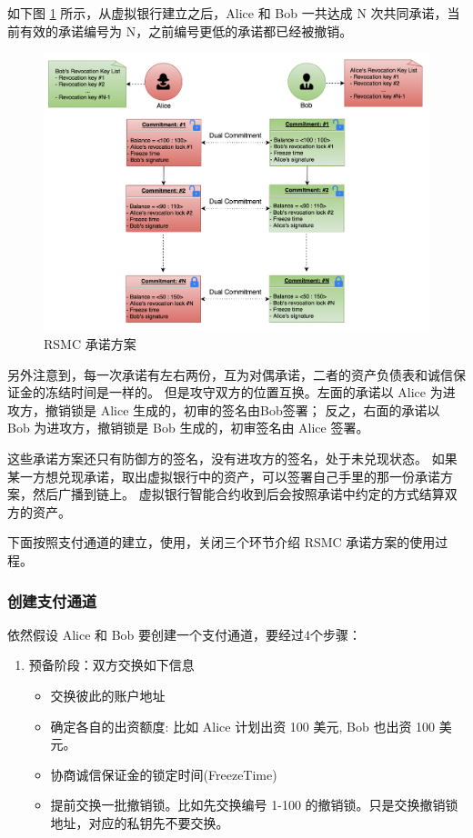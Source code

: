 \begin{appendices}
如下图 \ref{fig:rsmc_3} 所示，从虚拟银行建立之后，Alice 和 Bob 一共达成 N 次共同承诺，当前有效的承诺编号为 N，之前编号更低的承诺都已经被撤销。

\begin{figure}[h!]
    \centering
    \includegraphics[width=12cm, keepaspectratio]{../images/dual_rsmc_3.png}
    \caption{RSMC 承诺方案}
    \label{fig:rsmc_3}
\end{figure}

另外注意到，每一次承诺有左右两份，互为对偶承诺，二者的资产负债表和诚信保证金的冻结时间是一样的。
但是攻守双方的位置互换。左面的承诺以 Alice 为进攻方，撤销锁是 Alice 生成的，初审的签名由Bob签署；
反之，右面的承诺以 Bob 为进攻方，撤销锁是 Bob 生成的，初审签名由 Alice 签署。

这些承诺方案还只有防御方的签名，没有进攻方的签名，处于未兑现状态。
如果某一方想兑现承诺，取出虚拟银行中的资产，可以签署自己手里的那一份承诺方案，然后广播到链上。
虚拟银行智能合约收到后会按照承诺中约定的方式结算双方的资产。

下面按照支付通道的建立，使用，关闭三个环节介绍 RSMC 承诺方案的使用过程。

\subsubsection{创建支付通道}
依然假设 Alice 和 Bob 要创建一个支付通道，要经过4个步骤：
\begin{enumerate}
    \item 预备阶段：双方交换如下信息
        \begin{itemize}
            \item 交换彼此的账户地址 
            \item 确定各自的出资额度: 比如 Alice 计划出资 100 美元, Bob 也出资 100 美元。
            \item 协商诚信保证金的锁定时间(FreezeTime)
            \item 提前交换一批撤销锁。比如先交换编号 1-100 的撤销锁。只是交换撤销锁地址，对应的私钥先不要交换。
        \end{itemize}
    

\end{enumerate}
\end{appendices}
